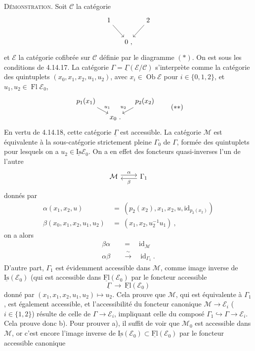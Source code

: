 \documentclass[11pt]{article}
\newcommand{\printedpage}[1]{\marginpar{\footnotesize p.~#1}}
\newcommand{\msp}[1]{\marginpar{\footnotesize [#1]}}
\newcommand{\Ob}{\operatorname{Ob}}
\newcommand{\Fl}{\operatorname{Fl}}
\newcommand{\id}{\mathrm{id}}
\newcommand{\uFl}{\underline{\mathrm{Fl}}}
\newcommand{\uIs}{\underline{\mathrm{Is}}}
\newcommand{\uGamma}{\underline{\Gamma}}
\begin{document}
\noindent\textsc{Démonstration}. Soit $\mathcal{C}$ la catégorie
\[
\begin{tikzcd}[column sep=small]
1 \arrow[dr] & & 2 \arrow[dl] \\
& 0 \ , &
\end{tikzcd}
\]
et $\mathcal{E}$ la catégorie cofibrée sur $\mathcal{C}$ définie par le diagramme $(*)$. On est sous les conditions de 4.14.17. La catégorie $\Gamma = \uGamma(\mathcal{E}/\mathcal{C})$ s’interprète
\printedpage{151}
\msp{page 398}
comme la catégorie des quintuplets $(x_0,x_1,x_2,u_1,u_2)$, avec $x_i \in \Ob\mathcal{E}$ pour $i \in \{0,1,2\}$, et $u_1, u_2 \in \Fl\mathcal{E}_0$,
\[
\begin{tikzcd}[column sep=small, row sep=small]
p_1(x_1) \arrow[dr, "u_1"] & & p_2(x_2) \arrow[dl, "u_2"'] \\
& x_0 \ . &
\end{tikzcd}
\tag*{$(**)$}
\]
En vertu de 4.14.18, cette catégorie $\uGamma$ est accessible. La catégorie $\mathcal{M}$ est équivalente à la sous-catégorie strictement pleine $\Gamma_0$ de $\Gamma$, formée des quintuplets pour lesquels on a $u_2 \in \uIs\mathcal{E}_0$. On a en effet des foncteurs quasi-inverses l’un de l’autre %
\[
\begin{tikzcd}
\mathcal{M} \arrow[r, shift left, "\alpha"] & \Gamma_1 \arrow[l, shift left, "\beta"]
\end{tikzcd}
\]
donnés par
\[
\begin{aligned}
\alpha(x_1,x_2,u) \ &= \ (p_2(x_2),x_1,x_2,u,\id_{p_2(x_2)})\\
\beta(x_0,x_1,x_2,u_1,u_2) \ &= \ (x_1,x_2,u_2^{-1}u_1) \ ,
\end{aligned}
\]
on a alors
\[
\begin{aligned}
\beta\alpha \quad &= \quad \id_{\mathcal{M}}\\
\alpha\beta \quad &\xrightarrow{\ \sim\ } \quad \id_{\Gamma_1} \ .
\end{aligned}
\]
D’autre part, $\Gamma_1$ est évidemment accessible dans $\mathcal{M}$, comme image inverse de $\uIs(\mathcal{E}_0)$ (qui %
\msp{page 399}
est accessible dans $\uFl(\mathcal{E}_0)$ par le foncteur accessible
\[
\uGamma \ \longrightarrow \ \uFl(\mathcal{E}_0)
\]
donné par $(x_1, x_1, x_2, u_1, u_2) \longmapsto u_2$. Cela prouve que $\mathcal{M}$, qui est équivalente à $\Gamma_1$, est également accessible, et l’accessibilité du foncteur canonique $\mathcal{M} \longrightarrow \mathcal{E}_i$ ($i \in \{1,2\}$) résulte de celle de $\Gamma \longrightarrow \mathcal{E}_i$, impliquant celle du composé $\Gamma_1 \hookrightarrow \Gamma \longrightarrow \mathcal{E}_i$. Cela prouve donc b). Pour prouver a), il suffit de voir que $\mathcal{M}_0$ est accessible dans $\mathcal{M}$, or c’est encore l’image inverse de $\uIs(\mathcal{E}_0) \subset \uFl(\mathcal{E}_0)$ par le foncteur accessible canonique %
\end{document}
